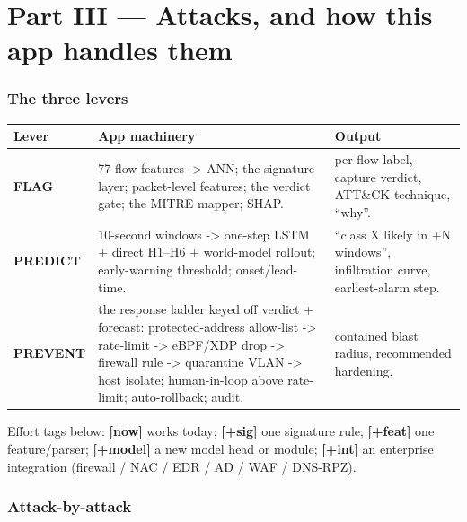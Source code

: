 \documentclass[11pt,a4paper]{article}
\begin{document}
\clearpage
\part*{Part III --- Attacks, and how this app handles them}

\section{The three levers}

\begin{table}[H]\centering\small
\begin{tabular}{@{}p{2.3cm}p{7.3cm}p{4.7cm}@{}}
\toprule
\textbf{Lever} & \textbf{App machinery} & \textbf{Output} \\ \midrule
\textbf{FLAG} & 77 flow features -> ANN; the signature layer;
  packet-level features; the verdict gate; the MITRE mapper; SHAP. &
  per-flow label, capture verdict, ATT\&CK technique, ``why''. \\
\textbf{PREDICT} & 10-second windows -> one-step LSTM + direct H1--H6
  + world-model rollout; early-warning threshold; onset/lead-time. &
  ``class X likely in +N windows'', infiltration curve, earliest-alarm step. \\
\textbf{PREVENT} & the response ladder keyed off verdict + forecast:
  protected-address allow-list -> rate-limit -> eBPF/XDP
  drop -> firewall rule -> quarantine VLAN -> host isolate; human-in-loop
  above rate-limit; auto-rollback; audit. &
  contained blast radius, recommended hardening. \\
\bottomrule
\end{tabular}
\end{table}

Effort tags below: \textbf{[now]} works today; \textbf{[+sig]} one signature
rule; \textbf{[+feat]} one feature/parser; \textbf{[+model]} a new model head or
module; \textbf{[+int]} an enterprise integration (firewall / NAC / EDR / AD /
WAF / DNS-RPZ).

\section{Attack-by-attack}

\newcommand{\atk}[4]{%
\subsection*{#1}
\begin{tabular}{@{}p{1.9cm}p{13cm}@{}}
\textbf{Flag} & #2 \\[2pt]
\textbf{Predict} & #3 \\[2pt]
\textbf{Prevent} & #4 \\
\end{tabular}}
\end{document}
